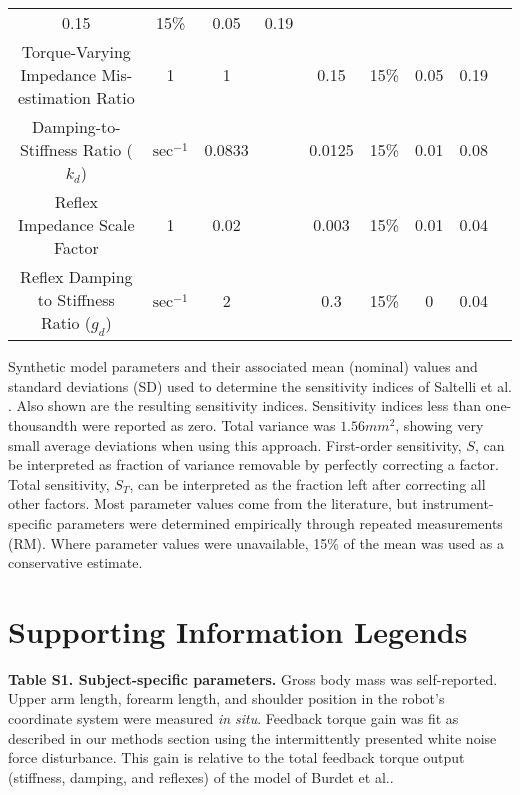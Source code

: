 \begin{table}[!ht]
\begin{tabular}{|c|c|c c|c c|c c|c|}
0.15 &
15\% &
0.05 &
0.19 \\
Torque-Varying Impedance Mis-estimation Ratio &
1 &
1 &
\cite{burdet2006stability} &
0.15 &
15\% &
0.05 &
0.19 \\
Damping-to-Stiffness Ratio ($k_d$) &
$\text{sec}^{-1}$ &
0.0833 &
\cite{burdet2006stability} &
0.0125 &
15\% &
0.01 &
0.08 \\
Reflex Impedance Scale Factor &
1 &
0.02 &
\cite{burdet2006stability} &
0.003 &
15\% &
0.01 &
0.04 \\
Reflex Damping to Stiffness Ratio ($g_d$) &
$\text{sec}^{-1}$ &
2 &
\cite{burdet2006stability} &
0.3 &
15\% &
0 &
0.04 \\ \hline
\end{tabular}
\begin{flushleft}Synthetic model parameters and their associated mean (nominal) values and standard deviations (SD) used to determine the sensitivity indices of Saltelli et al. \cite{saltelli2010variance}. Also shown are the resulting sensitivity indices. Sensitivity indices less than one-thousandth were reported as zero. Total variance was $1.56 mm^2$, showing very small average deviations when using this approach. First-order sensitivity, $S$, can be interpreted as fraction of variance removable by perfectly correcting a factor. Total sensitivity, $S_T$, can be interpreted as the fraction left after correcting all other factors. Most parameter values come from the literature, but instrument-specific parameters were determined empirically through repeated measurements (RM). Where parameter values were unavailable, 15\% of the mean was used as a conservative estimate.
\end{flushleft}
\label{tab:parameters}
\end{table}

\section*{Supporting Information Legends}

\begin{description}
\item{\bf Table S1. Subject-specific parameters.} Gross body mass was self-reported. Upper arm length, forearm length, and shoulder position in the robot's coordinate system were measured \textit{in situ}. Feedback torque gain was fit as described in our methods section using the intermittently presented white noise force disturbance. This gain is relative to the total feedback torque output (stiffness, damping, and reflexes) of the model of Burdet et al.\cite{burdet2006stability}.
\end{description}



